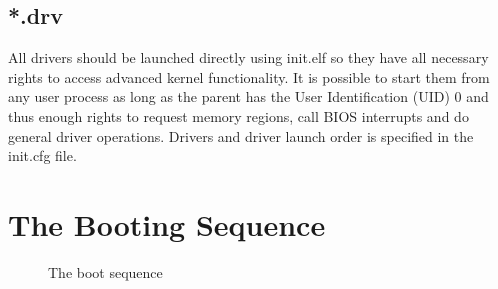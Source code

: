 \subsection{*.drv}
All drivers should be launched directly using init.elf so they have all necessary rights to access
advanced kernel functionality. It is possible to start them from any user process as long as the
parent has the User Identification (UID) 0 and thus enough rights to request memory regions, call BIOS interrupts
and do general driver operations. Drivers and driver launch order is specified in the init.cfg file.

\section{The Booting Sequence}
\begin{figure}[h!]
\scalebox{0.70}{}
\caption{The boot sequence}
\label{fig:bootsequence}
\end{figure}